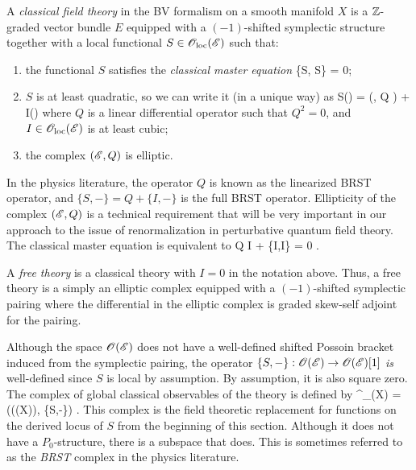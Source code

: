 \documentclass[10pt]{amsart}
\def\brian{\textcolor{blue}{BW: }\textcolor{blue}}
\begin{document}
\begin{dfn} \label{dfn: classical}
A {\em classical field theory} in the BV formalism on a smooth manifold $X$ is a $\mathbb Z$-graded vector bundle $E$ equipped with a $(-1)$-shifted symplectic structure together with a local functional $S \in {\mathscr O}_{\rm loc}(\mathscr E)$ such that:
\begin{enumerate}
\item the functional $S$ satisfies the {\em classical master equation} 
\ben
\{S, S\} = 0;
\een
\item $S$ is at least quadratic, so we can write it (in a unique way) as 
\ben
S(\varphi) = \omega(\varphi, Q \varphi) + I(\varphi)
\een
where $Q$ is a linear differential operator such that $Q^2 = 0$, and  $I \in {\mathscr O}_{\rm loc}(\mathscr E)$ is at least cubic;
\item the complex $(\mathscr E, Q)$ is elliptic.
\end{enumerate}
\end{dfn}

In the physics literature, the operator $Q$ is known as the linearized BRST operator, and $\{S,-\} = Q + \{I,-\}$ is the full BRST operator.
Ellipticity of the complex $(\mathscr E,Q)$ is a technical requirement that will be very important in our approach to the issue of renormalization in perturbative quantum field theory.
The classical master equation is equivalent to
\ben
Q I +  \{I,I\} = 0 .
\een

A {\em free theory} is a classical theory with $I = 0$ in the notation above. 
Thus, a free theory is a simply an elliptic complex equipped with a $(-1)$-shifted symplectic pairing where the differential in the elliptic complex is graded skew-self adjoint for the pairing.  

Although the space $\mathscr O(\mathscr E)$ does not have a well-defined shifted Possoin bracket induced from the symplectic pairing, the operator $\{S,-\} : \mathscr O(\mathscr E) \to \mathscr O(\mathscr E)[1]$ {\em is} well-defined since $S$ is local by assumption. 
By assumption, it is also square zero. 
The complex of global classical observables of the theory is defined by
\ben
\Obs^{\cl}_{\sE}(X) = (\sO(\sE(X)), \{S,-\}) .
\een
This complex is the field theoretic replacement for functions on the derived locus of $S$ from the beginning of this section.
Although it does not have a $P_0$-structure, there is a subspace that does. 
This is sometimes referred to as the {\em BRST} complex in the physics literature.

\end{document}
